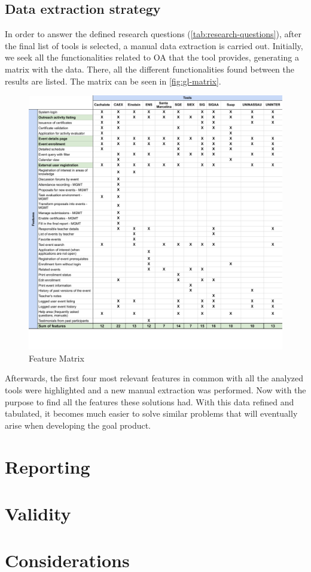 

\subsection{Data extraction strategy}\label{sec:gl-planning-datastrategy}

In order to answer the defined research questions (\autoref{tab:research-questions}), after the final list of tools is selected, a manual data extraction is carried out. Initially, we seek all the functionalities related to \ac{OA} that the tool provides, generating a matrix with the data. There, all the different functionalities found between the results are listed. The matrix can be seen in \autoref{fig:gl-matrix}.

\begin{figure}[htb]
  \caption{Feature Matrix}\label{fig:gl-matrix}
  \begin{center}
    \includegraphics[width=16cm]{img/functionality-matrix.pdf}
  \end{center}
\end{figure}

Afterwards, the first four most relevant features in common with all the analyzed tools were highlighted and a new manual extraction was performed. Now with the purpose to find all the features these solutions had. With this data refined and tabulated, it becomes much easier to solve similar problems that will eventually arise when developing the goal product.

\section{Reporting}\label{sec:gl-reporting}

\section{Validity}\label{sec:gl-validity}

\section{Considerations}\label{sec:gl-considerations}